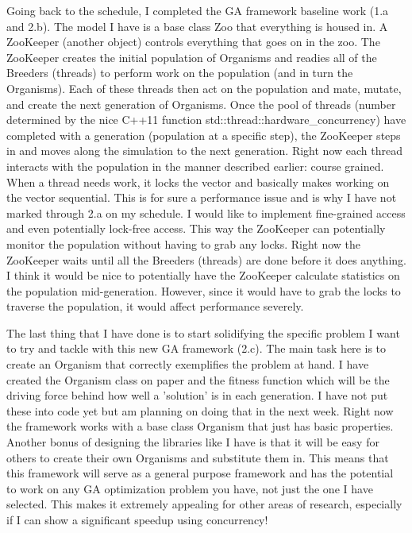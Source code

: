 \documentclass{acm_proc_article-sp}
\begin{document}
Going back to the schedule, I completed the GA framework baseline work (1.a and 2.b). The model I have is a base class Zoo that everything is housed in. A ZooKeeper (another object) controls everything that goes on in the zoo. The ZooKeeper creates the initial population of Organisms and readies all of the Breeders (threads) to perform work on the population (and in turn the Organisms). Each of these threads then act on the population and mate, mutate, and create the next generation of Organisms. Once the pool of threads (number determined by the nice C++11 function std::thread::hardware\_concurrency) have completed with a generation (population at a specific step), the ZooKeeper steps in and moves along the simulation to the next generation. Right now each thread interacts with the population in the manner described earlier: course grained. When a thread needs work, it locks the vector and basically makes working on the vector sequential. This is for sure a performance issue and is why I have not marked through 2.a on my schedule. I would like to implement fine-grained access and even potentially lock-free access. This way the ZooKeeper can potentially monitor the population without having to grab any locks. Right now the ZooKeeper waits until all the Breeders (threads) are done before it does anything. I think it would be nice to potentially have the ZooKeeper calculate statistics on the population mid-generation. However, since it would have to grab the locks to traverse the population, it would affect performance severely.

The last thing that I have done is to start solidifying the specific problem I want to try and tackle with this new GA framework (2.c). The main task here is to create an Organism that correctly exemplifies the problem at hand. I have created the Organism class on paper and the fitness function which will be the driving force behind how well a 'solution' is in each generation. I have not put these into code yet but am planning on doing that in the next week. Right now the framework works with a base class Organism that just has basic properties. Another bonus of designing the libraries like I have is that it will be easy for others to create their own Organisms and substitute them in. This means that this framework will serve as a general purpose framework and has the potential to work on any GA optimization problem you have, not just the one I have selected. This makes it extremely appealing for other areas of research, especially if I can show a significant speedup using concurrency!
\end{document}
